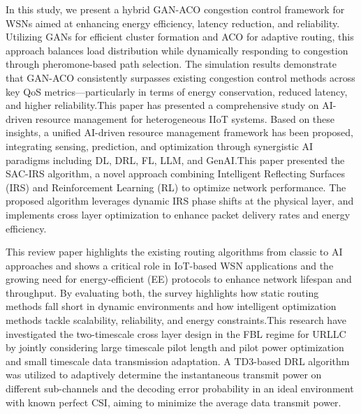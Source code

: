 \documentclass[a4paper,fleqn]{cas-dc}
\numberwithin{equation}{section}
\begin{document}
In this study\cite{sefati2025intelligent}, we present a hybrid GAN-ACO congestion control framework for WSNs aimed at enhancing energy efficiency, latency reduction, and reliability. Utilizing GANs for efficient cluster formation and ACO for adaptive routing, this approach balances load distribution while dynamically responding to congestion through pheromone-based path selection. The simulation results demonstrate that GAN-ACO consistently surpasses existing congestion control methods across key QoS metrics—particularly in terms of energy conservation, reduced latency, and higher reliability.This paper\cite{zheng2025ai} has presented a comprehensive study on AI-driven resource management for heterogeneous IIoT systems. Based on these insights, a unified AI-driven resource management framework has been proposed, integrating sensing, prediction, and optimization through synergistic AI paradigms including DL, DRL, FL, LLM, and GenAI.This paper presented \cite{fan2025optimizing} the SAC-IRS algorithm, a novel approach combining Intelligent Reflecting Surfaces (IRS) and Reinforcement Learning (RL) to optimize network performance. The proposed algorithm leverages dynamic IRS phase shifts at the physical layer, and implements cross layer optimization to enhance packet delivery rates and energy efficiency.

This review paper\cite{thakur2025ai} highlights the existing routing algorithms from classic to AI approaches and shows a critical role in IoT-based WSN applications and the growing need for energy-efficient (EE) protocols to enhance network lifespan and throughput. By evaluating both, the survey highlights how static routing methods fall short in dynamic environments and how intelligent optimization methods tackle scalability, reliability, and energy constraints.This research \cite{peng2025two} have investigated the two-timescale cross layer design in the FBL regime for URLLC by jointly considering large timescale pilot length and pilot power optimization and small timescale data transmission adaptation. A TD3-based DRL algorithm was utilized to adaptively determine the instantaneous transmit power on different sub-channels and the decoding error probability in an ideal environment with known perfect CSI, aiming to minimize the average data transmit power.
\end{document}
